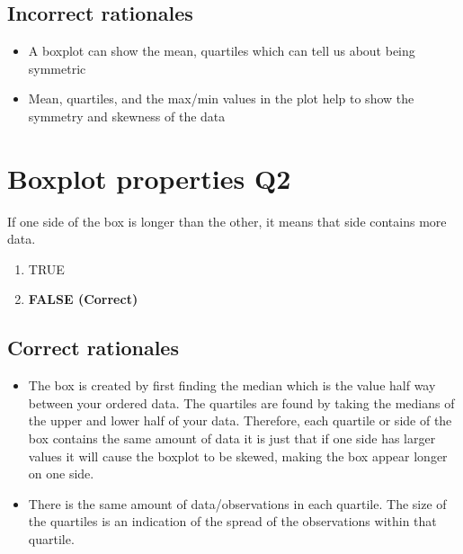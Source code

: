 \documentclass[letterpaper,9pt,twoside,printwatermark=false]{pinp}
\providecommand{\tightlist}{%
  \setlength{\itemsep}{0pt}\setlength{\parskip}{0pt}}
\begin{document}
\hypertarget{incorrect-rationales}{%
\subsection{Incorrect rationales}\label{incorrect-rationales}}

\begin{itemize}
\tightlist
\item
  A boxplot can show the mean, quartiles which can tell us about being
  symmetric
\item
  Mean, quartiles, and the max/min values in the plot help to show the
  symmetry and skewness of the data
\end{itemize}

\hypertarget{boxplot-properties-q2}{%
\section{Boxplot properties Q2}\label{boxplot-properties-q2}}

If one side of the box is longer than the other, it means that side
contains more data.

\begin{enumerate}
\def\labelenumi{\alph{enumi})}
\tightlist
\item
  TRUE
\item
  \textbf{FALSE (Correct)}
\end{enumerate}

\hypertarget{correct-rationales-1}{%
\subsection{Correct rationales}\label{correct-rationales-1}}

\begin{itemize}
\tightlist
\item
  The box is created by first finding the median which is the value half
  way between your ordered data. The quartiles are found by taking the
  medians of the upper and lower half of your data. Therefore, each
  quartile or side of the box contains the same amount of data it is
  just that if one side has larger values it will cause the boxplot to
  be skewed, making the box appear longer on one side.
\item
  There is the same amount of data/observations in each quartile. The
  size of the quartiles is an indication of the spread of the
  observations within that quartile.
\end{itemize}
\end{document}

